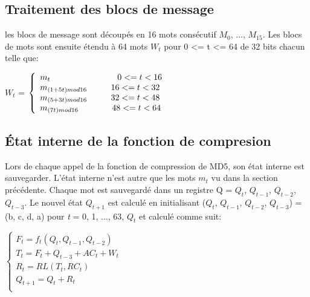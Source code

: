 \documentclass[a4paper,11pt,french]{article}
\begin{document}
\subsection{Traitement des blocs de message}
les blocs de message sont découpés en 16 mots consécutif $M_{0}$, ..., $M_{15}$. Les blocs de mots sont ensuite étendu à 64 mots $W_{t}$ pour 0 <= t <= 64 de 32 bits chacun telle que:
\vspace{.5cm}

$W_{t}$ =
$\left\{
\begin{array}{l}
  m_{t} \hspace{2.8cm} 0 <= t < 16\\
  m_{(1 + 5t) mod 16} \hspace{1cm} 16 <= t < 32\\
  m_{(5 + 3t) mod 16} \hspace{1cm} 32 <= t < 48\\
  m_{(7t) mod 16} \hspace{1.4cm} 48 <= t < 64\\
\end{array}
\right.$
\vspace{.5cm}

\subsection{État interne de la fonction de compresion}
Lors de chaque appel de la fonction de compression de MD5, son état interne est sauvegarder. L'état interne n'est autre que les mots $m_{t}$ vu dans la section précédente. Chaque mot est sauvegardé dans un registre Q = {$Q_{t}$, $Q_{t-1}$, $Q_{t-2}$, $Q_{t-3}$}. Le nouvel état $Q_{t+1}$ est calculé en initialisant ($Q_{t}$, $Q_{t-1}$, $Q_{t-2}$, $Q_{t-3}$) = (b, c, d, a) pour {\it{t}} = 0, 1, ..., 63, $Q_{t}$ et calculé comme suit:
\vspace{.5cm}

$\left\{
\begin{array}{l}
  F_t = f_t(Q_t, Q_{t-1}, Q_{t-2}) \\
  T_t = F_t + Q_{t-3} + AC_t + W_t \\
  R_t = RL(T_t, RC_t) \\
  Q_{t+1} = Q_t + R_t \\
\end{array}
\right.$
\vspace{.5cm}
\end{document}
